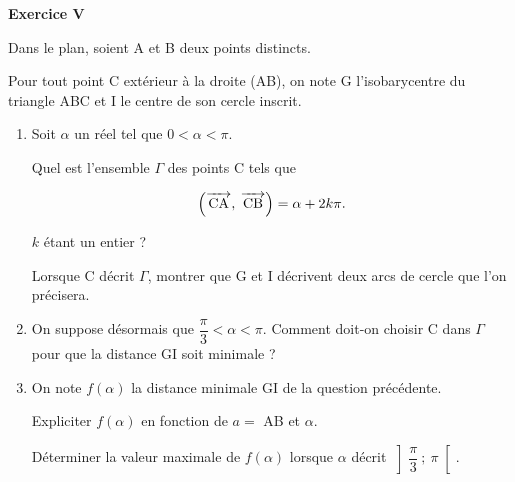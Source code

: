 \documentclass[a4paper,11pt]{article}
\newcommand{\vect}[1]{\overrightarrow{\,\mathstrut#1\,}}
\begin{document}
\begin{center}\textbf{{\color{blue} Exercice V}}
\end{center}

Dans le plan, soient A et B deux points distincts.

Pour tout point C extérieur à la droite (AB), on note G l'isobarycentre du triangle ABC et I le centre de son cercle inscrit.

\medskip

\begin{enumerate}
\item Soit $\alpha$ un réel tel que $0 < \alpha < \pi$. 

Quel est l'ensemble $\Gamma$ des points C tels que

\[\left(\vect{\text{CA}},\:\vect{\text{CB}}\right) = \alpha +2k\pi.\]

$k$ étant un entier ? 

Lorsque C décrit $\Gamma$, montrer que G et I décrivent deux arcs de
cercle que l'on précisera.
\item On suppose désormais que $\dfrac{\pi}{3} < \alpha < \pi$. Comment doit-on choisir C dans $\Gamma$pour que la distance GI soit minimale ?
\item On note $f(\alpha)$ la distance minimale GI de la question précédente. 

Expliciter $f(\alpha)$ en fonction de $a =$ AB et $\alpha$. 

Déterminer la valeur maximale de $f(\alpha)$ lorsque $\alpha$ décrit $\left]\dfrac{\pi}{3}~;~\pi\right[$.
\end{enumerate}
\end{document}
